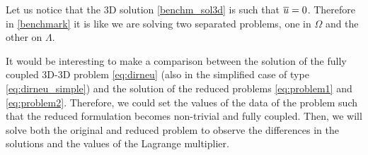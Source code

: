 \documentclass[r]{siamart171218}
\begin{document}
\begin{remark}
Let us notice that the 3D solution \eqref{benchm_sol3d} is such that $\overline{u}=0$. Therefore in \eqref{benchmark} it is like we are solving two separated problems, one in $\Omega$ and the other on $\Lambda$.
\end{remark}
\begin{remark}
It would be interesting to make a comparison between the solution of the fully coupled 3D-3D problem \eqref{eq:dirneu} (also in the simplified case of type \eqref{eq:dirneu_simple}) and the solution of the reduced problems \eqref{eq:problem1} and \eqref{eq:problem2}. 
Therefore, we could set the values of the data of the problem such that the reduced formulation becomes non-trivial and fully coupled.
Then, we will solve both the original and reduced problem to observe the differences in the solutions and the values of the Lagrange multiplier.
\end{remark}




\end{document}

